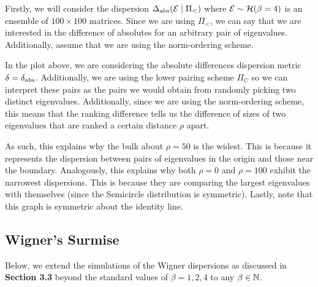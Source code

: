 Firstly, we will consider the dispersion $\Delta_{\text{abs}}(\mathcal{E} \mid \Pi_<)$ where $\mathcal{E} \sim \mathcal{H}(\beta = 4)$ is an ensemble of $100 \times 100$ matrices. Since we are using $\Pi_<$, we can say that we are interested in the difference of absolutes for an arbitrary pair of eigenvalues. Additionally, assume that we are using the norm-ordering scheme.



In the plot above, we are considering the absolute differences dispersion metric $\delta = \delta_{\text{abs}}$. Additionally, we are using the lower pairing scheme $\Pi_C$ so we can interpret these pairs as the pairs we would obtain from randomly picking two distinct eigenvalues.
Additionally, since we are using the norm-ordering scheme, this means that the ranking difference tells us the difference of sizes of two eigenvalues that are ranked a certain distance $\rho$ apart.

As such, this explains why the bulk about $\rho = 50$ is the widest. This is because it represents the dispersion between pairs of eigenvalues in the origin and those near the boundary. Analogously, this explains why both $\rho = 0$ and $\rho = 100$ exhibit the narrowest dispersions. This is because they are comparing the largest eigenvalues with themselves (since the Semicircle distribution is symmetric). Lastly, note that this graph is symmetric about the identity line.

\newpage
\subsection{Wigner's Surmise}


Below, we extend the simulations of the Wigner dispersions as discussed in \textbf{Section 3.3} beyond the standard values of $\beta = 1,2,4$ to any $\beta \in \mathbb{N}$.


